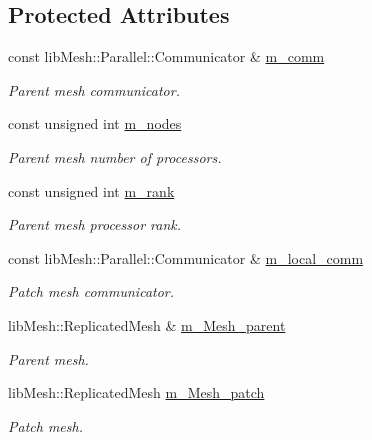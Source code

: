 \subsection*{Protected Attributes}
\begin{DoxyCompactItemize}
\item 
const lib\+Mesh\+::\+Parallel\+::\+Communicator \& \hyperlink{classcarl_1_1_patch__construction_a54402e1d7e2601e9208e619f7aad663a}{m\+\_\+comm}
\begin{DoxyCompactList}\small\item\em Parent mesh communicator. \end{DoxyCompactList}\item 
const unsigned int \hyperlink{classcarl_1_1_patch__construction_abd159e87cbe0bb4e9ec31283779c691c}{m\+\_\+nodes}
\begin{DoxyCompactList}\small\item\em Parent mesh number of processors. \end{DoxyCompactList}\item 
const unsigned int \hyperlink{classcarl_1_1_patch__construction_abb348e12e9fb16cb426e68127ec02c95}{m\+\_\+rank}
\begin{DoxyCompactList}\small\item\em Parent mesh processor rank. \end{DoxyCompactList}\item 
const lib\+Mesh\+::\+Parallel\+::\+Communicator \& \hyperlink{classcarl_1_1_patch__construction_a4fb3ddf7050cb02a6b0451536048f5d3}{m\+\_\+local\+\_\+comm}
\begin{DoxyCompactList}\small\item\em Patch mesh communicator. \end{DoxyCompactList}\item 
lib\+Mesh\+::\+Replicated\+Mesh \& \hyperlink{classcarl_1_1_patch__construction_aec2f60b62d5d7b44bfcc4f9ca9de28d2}{m\+\_\+\+Mesh\+\_\+parent}
\begin{DoxyCompactList}\small\item\em Parent mesh. \end{DoxyCompactList}\item 
lib\+Mesh\+::\+Replicated\+Mesh \hyperlink{classcarl_1_1_patch__construction_a4dfae5a2c4a983ac31dacec1cdb29d11}{m\+\_\+\+Mesh\+\_\+patch}
\begin{DoxyCompactList}\small\item\em Patch mesh. \end{DoxyCompactList}\item 

\end{DoxyCompactItemize}
